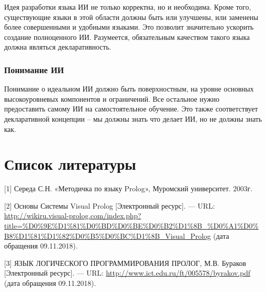\documentclass[14pt,a4paper,report]{report}
\begin{document}
Идея разработки языка ИИ не только корректна, но и необходима. Кроме того, существующие языки в этой области должны быть или улучшены, или заменены более совершенными и удобными языками. Это позволит значительно ускорить создание полноценного ИИ. Разумеется, обязательным качеством такого языка должна являться декларативность.

\subsubsection{Понимание ИИ}

Понимание о идеальном ИИ должно быть поверхностным, на уровне основных высокоуровневых компонентов и ограничений. Все остальное нужно предоставить самому ИИ на самостоятельное обучение. Это также соответствует декларативной концепции -- мы должны знать что делает ИИ, но не должны знать как.

\section{Список литературы}


\begin{flushleft}
	
[1] Середа С.Н. «Методичка по языку Prolog», Муромский университет. 2003г.\linebreak

[2] Основы Системы Visual Prolog [Электронный ресурс]. — URL: \href{http://wikiru.visual-prolog.com/index.php?title=\%D0\%9E\%D1\%81\%D0\%BD\%D0\%BE\%D0\%B2\%D1\%8B\_\%D0\%A1\%D0\%B8\%D1\%81\%D1\%82\%D0\%B5\%D0\%BC\%D1\%8B_Visual_Prolog}{http://wikiru.visual-prolog.com/index.php?title=\%D0\%9E\%D1\%81\%D0\%BD\%D0\%BE\%D0\%B2\%D1\%8B\_\%D0\%A1\%D0\%B8\%D1\%81\%D1\%82\%D0\%B5\%D0\%BC\%D1\%8B\_Visual\_Prolog} (дата обращения 09.11.2018). \linebreak
	
[3] ЯЗЫК ЛОГИЧЕСКОГО ПРОГРАММИРОВАНИЯ ПРОЛОГ, М.В. Бураков [Электронный ресурс]. — URL: \href{http://www.ict.edu.ru/ft/005578/byrakov.pdf}{http://www.ict.edu.ru/ft/005578/byrakov.pdf} (дата обращения 09.11.2018). \linebreak





\end{flushleft}
	
\end{document}

